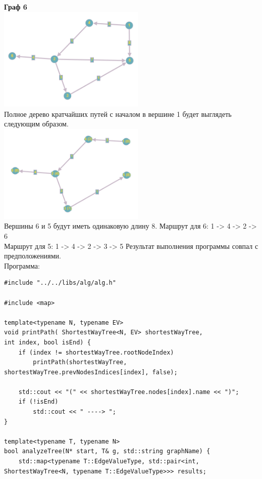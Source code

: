 \documentclass[a4paper,14pt]{extarticle}
\begin{document}
\begin{enumerate}[1.]
        \textbf{Граф 6}\\
        \includegraphics[width=70mm]{testTree6Before}\\
        Полное дерево кратчайших путей с началом в вершине 1 будет выглядеть следующим образом.\\
        \includegraphics[width=70mm]{testTree6After}\\
        Вершины 6 и 5 будут иметь одинаковую длину 8.\bigbreak
        Маршрут для 6: 1 -> 4 -> 2 -> 6\\
        Маршрут для 5: 1 -> 4 -> 2 -> 3 -> 5\bigbreak
        Результат выполнения программы совпал с предположениями.\\

        Программа:
        \begin{verbatim}
#include "../../libs/alg/alg.h"

#include <map>

template<typename N, typename EV>
void printPath( ShortestWayTree<N, EV> shortestWayTree, 
int index, bool isEnd) {
    if (index != shortestWayTree.rootNodeIndex)
        printPath(shortestWayTree, shortestWayTree.prevNodesIndices[index], false);

    std::cout << "(" << shortestWayTree.nodes[index].name << ")";
    if (!isEnd)
        std::cout << " ----> ";
}

template<typename T, typename N>
bool analyzeTree(N* start, T& g, std::string graphName) {
    std::map<typename T::EdgeValueType, std::pair<int, ShortestWayTree<N, typename T::EdgeValueType>>> results;
    

\end{verbatim}
\end{enumerate}
\end{document}
